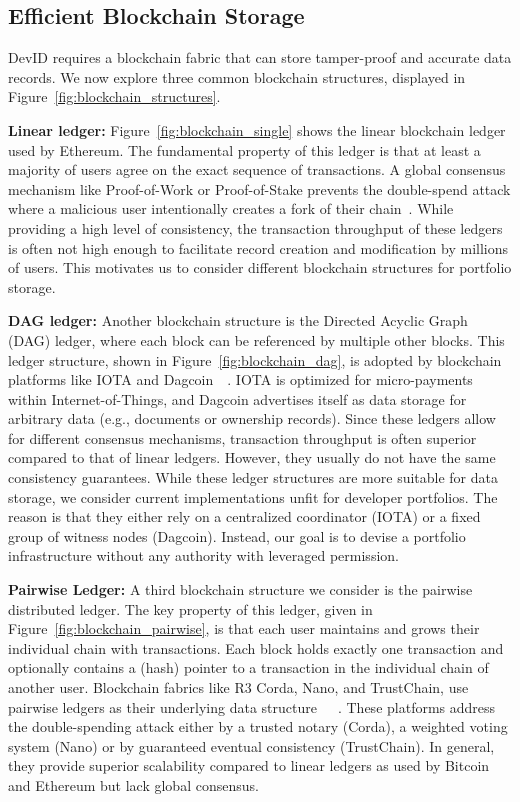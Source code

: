 \subsection{Efficient Blockchain Storage}
\label{subsec:scalable_blockchain}
DevID requires a blockchain fabric that can store tamper-proof and accurate data records.
We now explore three common blockchain structures, displayed in Figure~\ref{fig:blockchain_structures}.

\textbf{Linear ledger:} Figure~\ref{fig:blockchain_single} shows the linear blockchain ledger used by Ethereum.
The fundamental property of this ledger is that at least a majority of users agree on the exact sequence of transactions.
A global consensus mechanism like Proof-of-Work or Proof-of-Stake prevents the double-spend attack where a malicious user intentionally creates a fork of their chain~\cite{vukolic2015quest}.
While providing a high level of consistency, the transaction throughput of these ledgers is often not high enough to facilitate record creation and modification by millions of users.
This motivates us to consider different blockchain structures for portfolio storage.

\textbf{DAG ledger:} Another blockchain structure is the Directed Acyclic Graph (DAG) ledger, where each block can be referenced by multiple other blocks.
This ledger structure, shown in Figure~\ref{fig:blockchain_dag}, is adopted by blockchain platforms like IOTA and Dagcoin~\cite{popov2018tangle}~\cite{lerner2015dagcoin}.
IOTA is optimized for micro-payments within Internet-of-Things, and Dagcoin advertises itself as data storage for arbitrary data (e.g., documents or ownership records).
Since these ledgers allow for different consensus mechanisms, transaction throughput is often superior compared to that of linear ledgers.
However, they usually do not have the same consistency guarantees.
While these ledger structures are more suitable for data storage, we consider current implementations unfit for developer portfolios.
The reason is that they either rely on a centralized coordinator (IOTA) or a fixed group of witness nodes (Dagcoin).
Instead, our goal is to devise a portfolio infrastructure without any authority with leveraged permission.

\textbf{Pairwise Ledger:} A third blockchain structure we consider is the pairwise distributed ledger.
The key property of this ledger, given in Figure~\ref{fig:blockchain_pairwise}, is that each user maintains and grows their individual chain with transactions.
Each block holds exactly one transaction and optionally contains a (hash) pointer to a transaction in the individual chain of another user.
Blockchain fabrics like R3 Corda, Nano, and TrustChain, use pairwise ledgers as their underlying data structure~\cite{otte2017trustchain}~\cite{lemahieu2017raiblocks}~\cite{brown2017introducing}.
These platforms address the double-spending attack either by a trusted notary (Corda), a weighted voting system (Nano) or by guaranteed eventual consistency (TrustChain).
In general, they provide superior scalability compared to linear ledgers as used by Bitcoin and Ethereum but lack global consensus.

